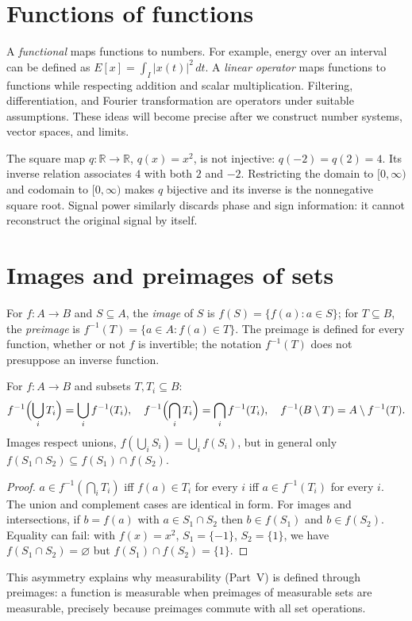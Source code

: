 \section{Functions of functions}
A \emph{functional} maps functions to numbers. For example, energy over an interval can be defined as $E[x]=\int_I |x(t)|^2\,dt$. A \emph{linear operator} maps functions to functions while respecting addition and scalar multiplication. Filtering, differentiation, and Fourier transformation are operators under suitable assumptions. These ideas will become precise after we construct number systems, vector spaces, and limits.

\begin{workedexample}
The square map $q:\mathbb R\to\mathbb R$, $q(x)=x^2$, is not injective: $q(-2)=q(2)=4$. Its inverse relation associates $4$ with both $2$ and $-2$. Restricting the domain to $[0,\infty)$ and codomain to $[0,\infty)$ makes $q$ bijective and its inverse is the nonnegative square root. Signal power similarly discards phase and sign information: it cannot reconstruct the original signal by itself.
\end{workedexample}
\section{Images and preimages of sets}
For $f:A\to B$ and $S\subseteq A$, the \emph{image} of $S$ is $f(S)=\{f(a):a\in S\}$; for $T\subseteq B$, the \emph{preimage} is $f^{-1}(T)=\{a\in A:f(a)\in T\}$. The preimage is defined for every function, whether or not $f$ is invertible; the notation $f^{-1}(T)$ does not presuppose an inverse function.

\begin{proposition}
For $f:A\to B$ and subsets $T,T_i\subseteq B$:
\[
f^{-1}\Bigl(\bigcup_iT_i\Bigr)=\bigcup_if^{-1}(T_i),\quad
f^{-1}\Bigl(\bigcap_iT_i\Bigr)=\bigcap_if^{-1}(T_i),\quad
f^{-1}(B\setminus T)=A\setminus f^{-1}(T).
\]
Images respect unions, $f(\bigcup_iS_i)=\bigcup_if(S_i)$, but in general only $f(S_1\cap S_2)\subseteq f(S_1)\cap f(S_2)$.
\end{proposition}
\begin{proof}
$a\in f^{-1}(\bigcap_iT_i)$ iff $f(a)\in T_i$ for every $i$ iff $a\in f^{-1}(T_i)$ for every $i$. The union and complement cases are identical in form. For images and intersections, if $b=f(a)$ with $a\in S_1\cap S_2$ then $b\in f(S_1)$ and $b\in f(S_2)$. Equality can fail: with $f(x)=x^2$, $S_1=\{-1\}$, $S_2=\{1\}$, we have $f(S_1\cap S_2)=\varnothing$ but $f(S_1)\cap f(S_2)=\{1\}$.
\end{proof}
This asymmetry explains why measurability (Part~V) is defined through preimages: a function is measurable when preimages of measurable sets are measurable, precisely because preimages commute with all set operations.

